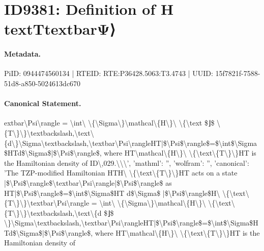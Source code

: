 \section*{ID9381: Definition of H textTtextbarΨ⟩}
\paragraph{Metadata.}
PiID: 0944474560134 | RTEID: RTE:P36428.5063:T3.4743 | UUID: 15f7821f-7588-51d8-a850-5024613dc670

\paragraph{Canonical Statement.}
extbar\textbackslash{}Psi\textbackslash{}rangle = \textbackslash{}int\textbackslash{} \textbackslash{}\{\textbackslash{}Sigma\textbackslash{}\}\textbackslash{}mathcal\textbackslash{}\{H\textbackslash{}\}\textbackslash{} \textbackslash{}\{\textbackslash{}text \$⌋\$ \textbackslash{}\{T\textbackslash{}\}\textbackslash{}\}\textbackslash{}textbackslash,\textbackslash{}text\textbackslash{}\{d\textbackslash{}\}\textbackslash{}Sigma\textbackslash{}textbackslash,\textbackslash{}textbar\textbackslash{}Psi\textbackslash{}rangleHT|\$\textbackslash{}Psi\$\textbackslash{}rangle\$=\$\textbackslash{}int\$\textbackslash{}Sigma\$HTd\$\textbackslash{}Sigma\$|\$\textbackslash{}Psi\$\textbackslash{}rangle\$, where HT\textbackslash{}mathcal\textbackslash{}\{H\textbackslash{}\}\textbackslash{} \textbackslash{}\{\textbackslash{}text\textbackslash{}\{T\textbackslash{}\}\textbackslash{}\}HT is the Hamiltonian density of ID\textbackslash{},029.\textbackslash{}\textbackslash{}\textbackslash{}', 'mathml': '', 'wolfram': '', 'canonical': 'The TZP-modified Hamiltonian HTH\textbackslash{} \textbackslash{}\{\textbackslash{}text\textbackslash{}\{T\textbackslash{}\}\textbackslash{}\}HT acts on a state |\$\textbackslash{}Psi\$\textbackslash{}rangle\$\textbackslash{}textbar\textbackslash{}Psi\textbackslash{}rangle|\$\textbackslash{}Psi\$\textbackslash{}rangle\$ as HT|\$\textbackslash{}Psi\$\textbackslash{}rangle\$=\$\textbackslash{}int\$\textbackslash{}Sigma\$HT d\$\textbackslash{}Sigma\$ |\$\textbackslash{}Psi\$\textbackslash{}rangle\$H\textbackslash{} \textbackslash{}\{\textbackslash{}text\textbackslash{}\{T\textbackslash{}\}\textbackslash{}\}\textbackslash{}textbar\textbackslash{}Psi\textbackslash{}rangle = \textbackslash{}int\textbackslash{} \textbackslash{}\{\textbackslash{}Sigma\textbackslash{}\}\textbackslash{}mathcal\textbackslash{}\{H\textbackslash{}\}\textbackslash{} \textbackslash{}\{\textbackslash{}text\textbackslash{}\{T\textbackslash{}\}\textbackslash{}\}\textbackslash{}textbackslash,\textbackslash{}text\textbackslash{}\{d \$⌋\$ \textbackslash{}\}\textbackslash{}Sigma\textbackslash{}textbackslash,\textbackslash{}textbar\textbackslash{}Psi\textbackslash{}rangleHT|\$\textbackslash{}Psi\$\textbackslash{}rangle\$=\$\textbackslash{}int\$\textbackslash{}Sigma\$HTd\$\textbackslash{}Sigma\$|\$\textbackslash{}Psi\$\textbackslash{}rangle\$, where HT\textbackslash{}mathcal\textbackslash{}\{H\textbackslash{}\}\textbackslash{} \textbackslash{}\{\textbackslash{}text\textbackslash{}\{T\textbackslash{}\}\textbackslash{}\}HT is the Hamiltonian density of 